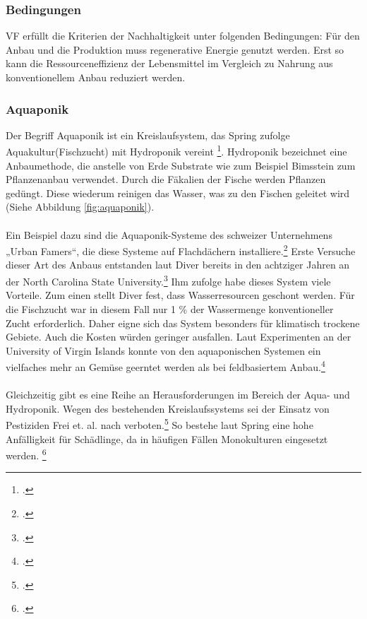 \documentclass{scrartcl}
\begin{document}
\subsubsection{Bedingungen}
VF erfüllt die Kriterien der Nachhaltigkeit unter folgenden Bedingungen:
Für den Anbau und die Produktion muss regenerative Energie genutzt werden. Erst so kann die Ressourceneffizienz der Lebensmittel im Vergleich zu Nahrung aus konventionellem Anbau reduziert werden. 


\subsubsection{Aquaponik}

Der Begriff Aquaponik ist ein Kreislaufsystem, das Spring zufolge Aquakultur(Fischzucht) mit Hydroponik vereint \footcite[Vgl.][S.44f]{TobiasSpringDerBasel-Stadt}. Hydroponik bezeichnet eine Anbaumethode, die anstelle von Erde Substrate wie zum Beispiel Bimsstein zum Pflanzenanbau verwendet. Durch die Fäkalien der Fische werden Pflanzen gedüngt. Diese wiederum reinigen das Wasser, was zu den Fischen geleitet wird (Siehe Abbildung \ref{fig:aquaponik}). \\
\\
Ein Beispiel dazu sind die Aquaponik-Systeme des schweizer Unternehmens „Urban Famers“, die diese Systeme auf Flachdächern installiere.\footcites[Vgl.][S.26f]{TobiasSpringDerBasel-Stadt} Erste Versuche dieser Art des Anbaus entstanden laut Diver bereits in den achtziger Jahren an der North Carolina State University.\footcite[Vgl.][S.4]{Diver2006Aquaponics-IntegrationAquaculture} 
Ihm zufolge habe dieses System viele Vorteile. Zum einen stellt Diver fest, dass Wasserresourcen geschont werden. Für die Fischzucht war in diesem Fall nur 1 \% der Wassermenge konventioneller Zucht erforderlich. Daher eigne sich das System besonders für klimatisch trockene Gebiete. Auch die Kosten würden geringer ausfallen. Laut Experimenten an der University of Virgin Islands konnte von den aquaponischen Systemen ein vielfaches mehr an Gemüse geerntet werden als bei feldbasiertem Anbau.\footcite[Vgl.][S.7f]{Diver2006Aquaponics-IntegrationAquaculture}  \\
\\Gleichzeitig gibt es eine Reihe an Herausforderungen im Bereich der Aqua- und Hydroponik. Wegen des bestehenden Kreislaufssystems sei der Einsatz von Pestiziden Frei et. al. nach verboten.\footcite[S.43]{FreiMatthiasHartmann2007AquaponikGemuse.}  So bestehe laut Spring eine hohe Anfälligkeit für Schädlinge, da in häufigen Fällen Monokulturen eingesetzt werden. \footcite[S.27]{TobiasSpringDerBasel-Stadt}
\end{document}
